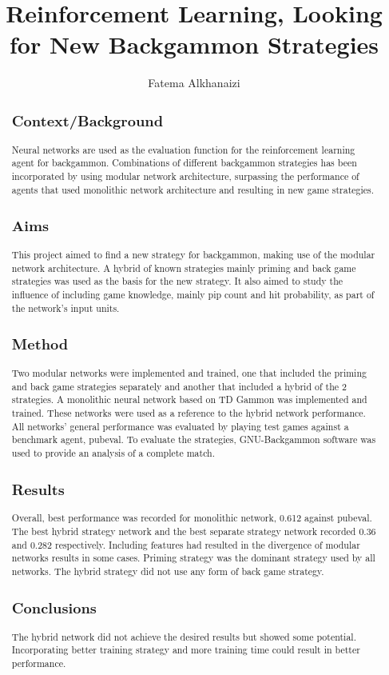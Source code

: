 \documentclass[12pt,a4paper]{article}
\title{Reinforcement Learning, Looking for New Backgammon Strategies}
\author{Fatema Alkhanaizi}
\date{}
\begin{document}
\maketitle

\begin{abstract}
\subsection{Context/Background}
Neural networks are used as the evaluation function for the reinforcement learning agent for backgammon. Combinations of different backgammon strategies has been incorporated by using modular network architecture, surpassing the performance of agents that used monolithic network architecture and resulting in new game strategies.
\subsection{Aims}
This project aimed to find a new strategy for backgammon, making use of the modular network architecture. A hybrid of known strategies mainly priming and back game strategies was used as the basis for the new strategy. It also aimed to study the influence of including game knowledge, mainly pip count and hit probability, as part of the network's input units. 
\subsection{Method}
Two modular networks were implemented and trained, one that included the priming and back game strategies separately and another that included a hybrid of the 2 strategies. A monolithic neural network based on TD Gammon was implemented and trained. These networks were used as a reference to the hybrid network performance. All networks' general performance was evaluated by playing test games against a benchmark agent, pubeval. To evaluate the strategies, GNU-Backgammon software was used to provide an analysis of a complete match.
\subsection{Results}
Overall, best performance was recorded for monolithic network, 0.612 against pubeval. The best hybrid strategy network and the best separate strategy network recorded 0.36 and 0.282 respectively. Including features had resulted in the divergence of modular networks results in some cases. Priming strategy was the dominant strategy used by all networks. The hybrid strategy did not use any form of back game strategy. 
\subsection{Conclusions}
The hybrid network did not achieve the desired results but showed some potential. Incorporating better training strategy and more training time could result in better performance. 
\end{abstract}
\end{document}
